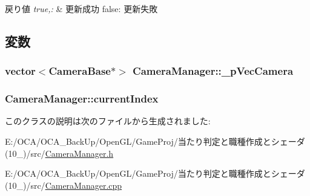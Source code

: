 \begin{DoxyRetVals}{戻り値}
{\em true,\-:} & 更新成功 false\-: 更新失敗 \\
\hline
\end{DoxyRetVals}


\subsection{変数}
\hypertarget{class_camera_manager_adebeac379b0624f1abccef0da6888aa8}{
\subsubsection[{\-\_\-p\-Vec\-Camera}]{\setlength{\rightskip}{0pt plus 5cm}vector$<${\bf Camera\-Base}$\ast$$>$ Camera\-Manager\-::\-\_\-p\-Vec\-Camera\hspace{0.3cm}{\ttfamily [protected]}}}\label{class_camera_manager_adebeac379b0624f1abccef0da6888aa8}
\hypertarget{class_camera_manager_aa6ac62939777a393fedbea0d40ef0bfc}{
\subsubsection[{current\-Index}]{ Camera\-Manager\-::current\-Index\hspace{0.3cm}{\ttfamily [protected]}}}\label{class_camera_manager_aa6ac62939777a393fedbea0d40ef0bfc}


このクラスの説明は次のファイルから生成されました\-:\begin{DoxyCompactItemize}
\item 
E\-:/\-O\-C\-A/\-O\-C\-A\-\_\-\-Back\-Up/\-Open\-G\-L/\-Game\-Proj/当たり判定と職種作成とシェーダ(10\-\_)/src/\hyperlink{_camera_manager_8h}{Camera\-Manager.\-h}\item 
E\-:/\-O\-C\-A/\-O\-C\-A\-\_\-\-Back\-Up/\-Open\-G\-L/\-Game\-Proj/当たり判定と職種作成とシェーダ(10\-\_)/src/\hyperlink{_camera_manager_8cpp}{Camera\-Manager.\-cpp}\end{DoxyCompactItemize}
